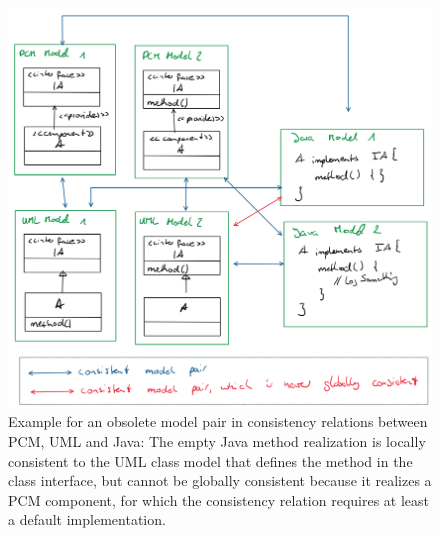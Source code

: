 \begin{figure}
    \centering
    \includegraphics[width=\textwidth]{figures/correctness/compatibility/obsolete_relations_scenario.png}
    \caption[Concrete scenario with obsolete relation elements]{Example for an obsolete model pair in consistency relations between \gls{PCM}, UML and Java: The empty Java method realization is locally consistent to the UML class model that defines the method in the class interface, but cannot be globally consistent because it realizes a \gls{PCM} component, for which the consistency relation requires at least a default implementation.}
    \label{fig:compatibility:obsolete_relations_scenario}
\end{figure}

